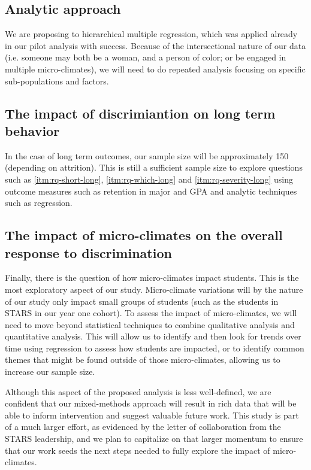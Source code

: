 \subsection{Analytic approach}
We are proposing to hierarchical multiple regression, which was applied already in our pilot analysis with success. Because of the intersectional nature of our data (i.e. someone may both be a woman, and a person of color; or be engaged in multiple micro-climates), we will need to do repeated analysis focusing on specific sub-populations and factors. 


\subsection{The impact of discrimiantion on long term behavior}
In the case of long term outcomes, our sample size will be approximately 150 (depending on attrition). This is still a sufficient sample size to explore questions such as \ref{itm:rq-short-long}, \ref{itm:rq-which-long} and \ref{itm:rq-severity-long} using outcome measures such as retention in major and GPA and analytic techniques such as regression. 

\subsection{The impact of micro-climates on the overall response to discrimination}
Finally, there is the question of how micro-climates impact students. This is the most exploratory aspect of our study. Micro-climate variations will by the nature of our study only impact small groups of students (such as the \XXFILLIN students in STARS in our year one cohort). To assess the impact of micro-climates, we will need to move beyond statistical techniques to combine qualitative analysis and quantitative analysis. This will allow us to identify and then look for trends over time using regression to assess how students are impacted, or to identify common themes that might be found outside of those micro-climates, allowing us to increase our sample size.

Although this aspect of the proposed analysis is less well-defined, we are confident that our mixed-methods approach will result in rich data that will be able to inform intervention and suggest valuable future work. This study is part of a much larger effort, as evidenced by the letter of collaboration from the STARS leadership, and we plan to capitalize on that larger momentum to ensure that our work seeds the next steps needed to fully explore the impact of micro-climates. 


